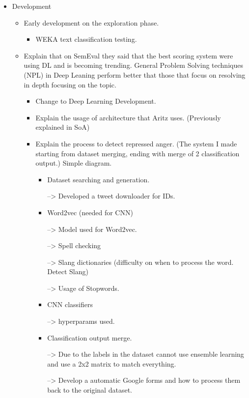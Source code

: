 \begin{itemize}
  \item Development
  \begin{itemize}
    \item Early development on the exploration phase.
    \begin{itemize}
      \item WEKA text classification testing.
    \end{itemize}
    \item Explain that on SemEval they said that the best scoring system were using DL and is becoming trending. General Problem Solving techniques (NPL) in Deep Leaning perform better that those that focus on resolving in depth focusing on the topic.
    \begin{itemize}
      \item Change to Deep Learning Development.
      \item Explain the usage of architecture that Aritz uses. (Previously explained in SoA)
      \item Explain the process to detect repressed anger. (The system I made starting from dataset merging, ending with merge of 2 classification output.) Simple diagram.
      \begin{itemize}
        \item Dataset searching and generation.

          --> Developed a tweet downloader for IDs.

        \item Word2vec (needed for CNN)

          --> Model used for Word2vec.
          
          --> Spell checking
          
          --> Slang dictionaries (difficulty on when to process the word. Detect Slang)
          
          --> Usage of Stopwords.

        \item CNN classifiers

          --> hyperparams used.

        \item Classification output merge.
        
        --> Due to the labels in the dataset cannot use ensemble learning and use a 2x2 matrix to match everything.
        
        --> Develop a automatic Google forms and how to process them back to the original dataset.
      \end{itemize}
    \end{itemize}
  \end{itemize}


\end{itemize}
